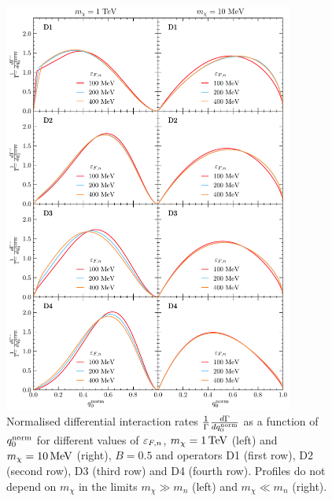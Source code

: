 \begin{figure}[t!bp]
    \centering
    \includegraphics[width = 0.85\textwidth]{capture_1/norm_diff_intrate.pdf}    
    \caption[Normalised differential interaction rates $\frac{1}{\Gamma}\frac{d\Gamma}{d\qonorm}$ as a function of $\qonorm$.]{Normalised differential interaction rates $\frac{1}{\Gamma}\frac{d\Gamma}{d\qonorm}$ as a function of $\qonorm$ for different values of $\varepsilon_{F,n}$, $m_\chi=1{\rm \,TeV}$ (left) and $m_\chi=10{\rm \,MeV}$ (right), $B=0.5$ and  operators D1 (first row), D2 (second row), D3 (third row) and D4 (fourth row). Profiles do not depend on $m_\chi$ in the limits $m_\chi\gg m_n$ (left) and $m_\chi\ll m_n$ (right).  }
    \label{ch3:fig:diffintratesd14}
\end{figure}


